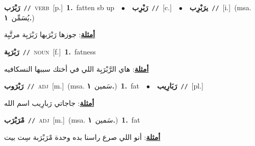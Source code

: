 \documentclass[10pt,a4paper,twoside]{article} %
\begin{document}
\begin{multicols}{2}
{\setlength\topsep{0pt}\textbf{\foreignlanguage{arabic}{رَبْرَب}}\ {\color{gray}\texttt{//}\color{black}}\ \textsc{verb}\ [p.]\ \textbf{1.}~fatten sb up\ \ $\bullet$\ \ \setlength\topsep{0pt}\textbf{\foreignlanguage{arabic}{رَبْرِب}}\ {\color{gray}\texttt{//}\color{black}}\ [c.]\ \ $\bullet$\ \ \setlength\topsep{0pt}\textbf{\foreignlanguage{arabic}{يرَبْرِب}}\ {\color{gray}\texttt{//}\color{black}}\ [i.]\ \color{gray}(msa. \foreignlanguage{arabic}{يُسَمِّن}~\foreignlanguage{arabic}{\textbf{١.}})\color{black}\  \begin{flushright}\color{gray}\foreignlanguage{arabic}{\textbf{\underline{\foreignlanguage{arabic}{أمثلة}}}: جوزها رَبْرَبها رَبْرَبِة مرتَّبِة}\end{flushright}\color{black}} \vspace{2mm}

{\setlength\topsep{0pt}\textbf{\foreignlanguage{arabic}{رَبْرَبِة}}\ {\color{gray}\texttt{//}\color{black}}\ \textsc{noun}\ [f.]\ \textbf{1.}~fatness\  \begin{flushright}\color{gray}\foreignlanguage{arabic}{\textbf{\underline{\foreignlanguage{arabic}{أمثلة}}}: هاي الرَّبْرَبِة اللي في أختك سببها النسكافيه}\end{flushright}\color{black}} \vspace{2mm}

{\setlength\topsep{0pt}\textbf{\foreignlanguage{arabic}{رَبْرَوب}}\ {\color{gray}\texttt{//}\color{black}}\ \textsc{adj}\ [m.]\ \color{gray}(msa. \foreignlanguage{arabic}{سَمين}~\foreignlanguage{arabic}{\textbf{١.}})\color{black}\ \textbf{1.}~fat\ \ $\bullet$\ \ \setlength\topsep{0pt}\textbf{\foreignlanguage{arabic}{رَبَارِيب}}\ {\color{gray}\texttt{//}\color{black}}\ [pl.]\  \begin{flushright}\color{gray}\foreignlanguage{arabic}{\textbf{\underline{\foreignlanguage{arabic}{أمثلة}}}: جاجاتي رَبارِيب اسم الله}\end{flushright}\color{black}} \vspace{2mm}

{\setlength\topsep{0pt}\textbf{\foreignlanguage{arabic}{مْرَبْرَب}}\ {\color{gray}\texttt{//}\color{black}}\ \textsc{adj}\ [m.]\ \color{gray}(msa. \foreignlanguage{arabic}{سَمين}~\foreignlanguage{arabic}{\textbf{١.}})\color{black}\ \textbf{1.}~fat\  \begin{flushright}\color{gray}\foreignlanguage{arabic}{\textbf{\underline{\foreignlanguage{arabic}{أمثلة}}}: أنو اللي صرع راسنا بده وحدة مْرَبْرَبة سِت بيت}\end{flushright}\color{black}} \vspace{2mm}


\end{multicols}
\end{document}
